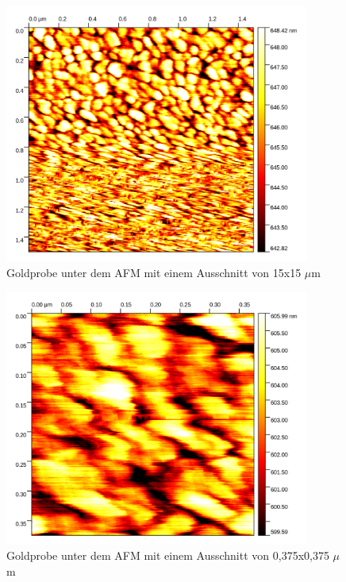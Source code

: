 \begin{figure}[h]
    \centering
    \includegraphics[width = 10cm]{Bilder/Gold/Gold15um.png}
    \caption{Goldprobe unter dem AFM mit einem Ausschnitt von 15x15 $\mu$m}
    \label{Gold2}
\end{figure}



\begin{figure}[h]
    \centering
    \includegraphics[width = 10cm]{Bilder/Gold/Gold0375um.png}
    \caption{Goldprobe unter dem AFM mit einem Ausschnitt von 0,375x0,375 $\mu$m}
    \label{Gold3}
\end{figure}
